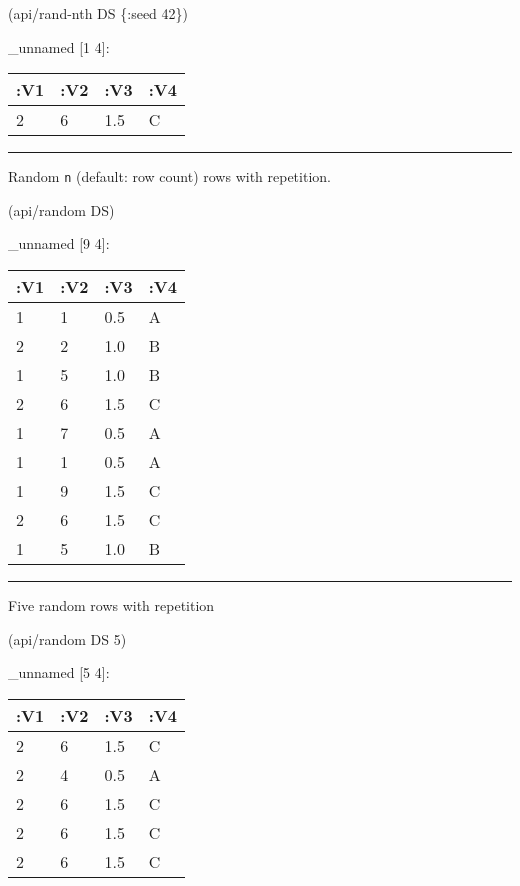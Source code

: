 \documentclass[]{article}
\newenvironment{Shaded}{\begin{snugshade}}{\end{snugshade}}
\newcommand{\AttributeTok}[1]{\textcolor[rgb]{0.77,0.63,0.00}{#1}}
\newcommand{\DecValTok}[1]{\textcolor[rgb]{0.00,0.00,0.81}{#1}}
\newcommand{\NormalTok}[1]{#1}
\begin{document}
\begin{Shaded}
\begin{Highlighting}[]
\NormalTok{(api/rand-nth DS \{}\AttributeTok{:seed} \DecValTok{42}\NormalTok{\})}
\end{Highlighting}
\end{Shaded}

\_unnamed {[}1 4{]}:

\begin{longtable}[]{@{}llll@{}}
\toprule
:V1 & :V2 & :V3 & :V4\tabularnewline
\midrule
\endhead
2 & 6 & 1.5 & C\tabularnewline
\bottomrule
\end{longtable}

\begin{center}\rule{0.5\linewidth}{0.5pt}\end{center}

Random \texttt{n} (default: row count) rows with repetition.

\begin{Shaded}
\begin{Highlighting}[]
\NormalTok{(api/random DS)}
\end{Highlighting}
\end{Shaded}

\_unnamed {[}9 4{]}:

\begin{longtable}[]{@{}llll@{}}
\toprule
:V1 & :V2 & :V3 & :V4\tabularnewline
\midrule
\endhead
1 & 1 & 0.5 & A\tabularnewline
2 & 2 & 1.0 & B\tabularnewline
1 & 5 & 1.0 & B\tabularnewline
2 & 6 & 1.5 & C\tabularnewline
1 & 7 & 0.5 & A\tabularnewline
1 & 1 & 0.5 & A\tabularnewline
1 & 9 & 1.5 & C\tabularnewline
2 & 6 & 1.5 & C\tabularnewline
1 & 5 & 1.0 & B\tabularnewline
\bottomrule
\end{longtable}

\begin{center}\rule{0.5\linewidth}{0.5pt}\end{center}

Five random rows with repetition

\begin{Shaded}
\begin{Highlighting}[]
\NormalTok{(api/random DS }\DecValTok{5}\NormalTok{)}
\end{Highlighting}
\end{Shaded}

\_unnamed {[}5 4{]}:

\begin{longtable}[]{@{}llll@{}}
\toprule
:V1 & :V2 & :V3 & :V4\tabularnewline
\midrule
\endhead
2 & 6 & 1.5 & C\tabularnewline
2 & 4 & 0.5 & A\tabularnewline
2 & 6 & 1.5 & C\tabularnewline
2 & 6 & 1.5 & C\tabularnewline
2 & 6 & 1.5 & C\tabularnewline
\bottomrule
\end{longtable}
\end{document}

